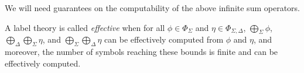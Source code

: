 We will need guarantees on the computability
of the above infinite sum operators.
%
\begin{definition}\label{def:effective}
A label theory is called \emph{effective} when
for all $\phi \in \Phi_\Sigma$ and $\eta \in \Phi_{\Sigma, \Delta}$,
$\bigoplus_{\Sigma} \phi$,
$\bigoplus_{\Delta}\bigoplus_{\Sigma} \eta$, and
$\bigoplus_{\Sigma}\bigoplus_{\Delta} \eta$
can be effectively computed from $\phi$ and $\eta$,
and moreover, the number of symbols reaching these bounds is finite
and can be effectively computed.
\end{definition}






%



